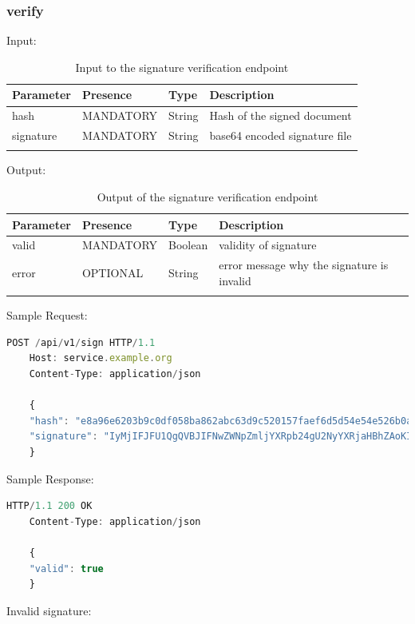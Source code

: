 \subsubsection{verify}
Input:

\begin{longtable}{|l|l|l|l|}
    \hline
    \textbf{Parameter} & \textbf{Presence} & \textbf{Type} & \textbf{Description} \\ \hline
    hash & MANDATORY & String & Hash of the signed document \\ \hline
    signature & MANDATORY & String & base64 encoded signature file \\ \hline
    \caption{Input to the signature verification endpoint}
\end{longtable}

Output:

\begin{longtable}{|l|l|l|l|}
    \hline
    \textbf{Parameter} & \textbf{Presence} & \textbf{Type} & \textbf{Description} \\ \hline
    valid & MANDATORY & Boolean & validity of signature \\ \hline
    error & OPTIONAL & String & error message why the signature is invalid \\ \hline
    \caption{Output of the signature verification endpoint}
\end{longtable}

Sample Request:
\begin{lstlisting}[caption={sign request}, captionpos=b, language=JavaScript, label={lst:verifyrequest}]
    POST /api/v1/sign HTTP/1.1
    Host: service.example.org
    Content-Type: application/json

    {
    "hash": "e8a96e6203b9c0df058ba862abc63d9c520157faef6d5d54e54e526b0a85b2be",
    "signature": "IyMjIFJFU1QgQVBJIFNwZWNpZmljYXRpb24gU2NyYXRjaHBhZAoKIyMjIyBQcmUtQXV0aCBlbmRw...b2ludCAKIyMjIyMgRW5kcG9pbnQKYGBgUE9TVCAvYXBpL3YxL3NpZ25gYGAK"
    }
\end{lstlisting}

Sample Response:

\begin{lstlisting}[caption={sign response}, captionpos=b, language=JavaScript, label={lst:verifyresponse}]
    HTTP/1.1 200 OK
    Content-Type: application/json

    {
    "valid": true
    }
\end{lstlisting}

Invalid signature:

